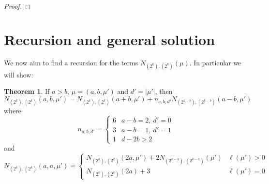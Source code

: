 \documentclass[thesis]{thesis-umich}           %
\theoremstyle{definition}
\newtheorem{thm}{Theorem}[section]
\begin{document}
\begin{proof}
\end{proof}

\section{Recursion and general solution}

We now aim to find a recursion for the terms $N_{(2^k),(2^k)}(\mu)$. In particular we will show:

\begin{thm}
  If $a>b$, $\mu=(a,b,\mu')$ and $d'=|\mu'|$, then
  \[
  N_{(2^k),(2^k)}(a,b,\mu')=N_{(2^k),(2^k)}(a+b,\mu')+n_{a,b,d'}N_{(2^{k-b}),(2^{k-b})}(a-b,\mu')
  \]
  where \[n_{a,b,d'}=\begin{cases}
  6 & a-b=2,\ d'=0 \\
  3 & a-b=1,\ d'=1 \\
  1 & d-2b>2 \end{cases}
  \]
  and
  \[
  N_{(2^k),(2^k)}(a,a,\mu')=
  \begin{cases}
    N_{(2^k),(2^k)}(2a,\mu')+2N_{(2^{k-a}),(2^{k-a})}(\mu') & \ell(\mu')>0 \\
    N_{(2^k),(2^k)}(2a)+3 & \ell(\mu')=0
    \end{cases}
  \]
  \end{thm}
\end{document}
